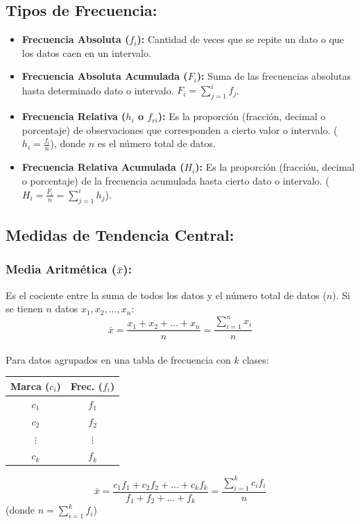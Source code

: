 \documentclass[12pt, letterpaper]{article}
\begin{document}
\subsection{Tipos de Frecuencia:}
\begin{itemize}
	\item \textbf{Frecuencia Absoluta ($f_i$):} Cantidad de veces que se repite un dato o que los datos caen en un intervalo.
	\item \textbf{Frecuencia Absoluta Acumulada ($F_i$):} Suma de las frecuencias absolutas hasta determinado dato o intervalo. $F_i = \sum_{j=1}^{i} f_j$.
	\item \textbf{Frecuencia Relativa ($h_i$ o $f_{ri}$):} Es la proporción (fracción, decimal o porcentaje) de observaciones que corresponden a cierto valor o intervalo. ($h_i = \frac{f_i}{n}$), donde $n$ es el número total de datos.
	\item \textbf{Frecuencia Relativa Acumulada ($H_i$):} Es la proporción (fracción, decimal o porcentaje) de la frecuencia acumulada hasta cierto dato o intervalo. ($H_i = \frac{F_i}{n} = \sum_{j=1}^{i} h_j$).
\end{itemize}
\newpage

\subsection{Medidas de Tendencia Central:}

\subsubsection{Media Aritmética ($\bar{x}$):}
Es el cociente entre la suma de todos los datos y el número total de datos ($n$). Si se tienen $n$ datos $x_1, x_2, \dots, x_n$:
\[ \bar{x}=\frac{x_1+x_2+\dots+x_n}{n} = \frac{\sum_{i=1}^{n} x_i}{n} \] \\
Para datos agrupados en una tabla de frecuencia con $k$ clases:

\begin{center}
	\begin{minipage}{0.35\textwidth}
		\centering
		\begin{tabular}{|c|c|}
			\hline
			\textbf{Marca ($c_i$)} & \textbf{Frec. ($f_i$)} \\
			\hline
			$c_1$                  & $f_1$                  \\
			\hline
			$c_2$                  & $f_2$                  \\
			\hline
			$\vdots$               & $\vdots$               \\
			\hline
			$c_k$                  & $f_k$                  \\
			\hline
		\end{tabular}
	\end{minipage}
	\hfill
	\begin{minipage}{0.55\textwidth}
		\centering
		\[ \bar{x}=\frac{c_1 f_1 + c_2 f_2 + \dots + c_k f_k}{f_1+f_2+\dots+f_k} = \frac{\sum_{i=1}^{k} c_i f_i}{n} \]
		(donde $n = \sum_{i=1}^{k} f_i$)
	\end{minipage}
\end{center}
\end{document}
